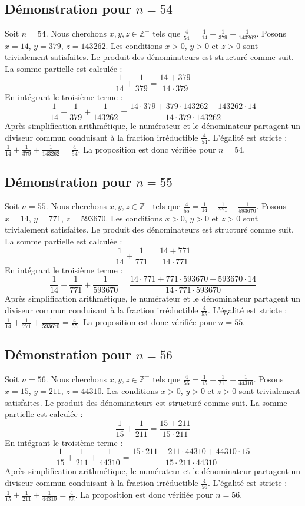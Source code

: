\documentclass[11pt,a4paper]{article}
\begin{document}
\subsection{Démonstration pour $n = 54$}
Soit $n = 54$. Nous cherchons $x, y, z \in \mathbb{Z}^{+}$ tels que $\frac{4}{54} = \frac{1}{14} + \frac{1}{379} + \frac{1}{143262}$.
Posons $x = 14$, $y = 379$, $z = 143262$.
Les conditions $x > 0$, $y > 0$ et $z > 0$ sont trivialement satisfaites.
Le produit des dénominateurs est structuré comme suit. La somme partielle est calculée :
$$ \frac{1}{14} + \frac{1}{379} = \frac{14+379}{14 \cdot 379} $$
En intégrant le troisième terme :
$$ \frac{1}{14} + \frac{1}{379} + \frac{1}{143262} = \frac{14 \cdot 379 + 379 \cdot 143262 + 143262 \cdot 14}{14 \cdot 379 \cdot 143262} $$
Après simplification arithmétique, le numérateur et le dénominateur partagent un diviseur commun conduisant à la fraction irréductible $\frac{4}{54}$.
L'égalité est stricte : $\frac{1}{14} + \frac{1}{379} + \frac{1}{143262} = \frac{4}{54}$.
La proposition est donc vérifiée pour $n = 54$.
\subsection{Démonstration pour $n = 55$}
Soit $n = 55$. Nous cherchons $x, y, z \in \mathbb{Z}^{+}$ tels que $\frac{4}{55} = \frac{1}{14} + \frac{1}{771} + \frac{1}{593670}$.
Posons $x = 14$, $y = 771$, $z = 593670$.
Les conditions $x > 0$, $y > 0$ et $z > 0$ sont trivialement satisfaites.
Le produit des dénominateurs est structuré comme suit. La somme partielle est calculée :
$$ \frac{1}{14} + \frac{1}{771} = \frac{14+771}{14 \cdot 771} $$
En intégrant le troisième terme :
$$ \frac{1}{14} + \frac{1}{771} + \frac{1}{593670} = \frac{14 \cdot 771 + 771 \cdot 593670 + 593670 \cdot 14}{14 \cdot 771 \cdot 593670} $$
Après simplification arithmétique, le numérateur et le dénominateur partagent un diviseur commun conduisant à la fraction irréductible $\frac{4}{55}$.
L'égalité est stricte : $\frac{1}{14} + \frac{1}{771} + \frac{1}{593670} = \frac{4}{55}$.
La proposition est donc vérifiée pour $n = 55$.
\subsection{Démonstration pour $n = 56$}
Soit $n = 56$. Nous cherchons $x, y, z \in \mathbb{Z}^{+}$ tels que $\frac{4}{56} = \frac{1}{15} + \frac{1}{211} + \frac{1}{44310}$.
Posons $x = 15$, $y = 211$, $z = 44310$.
Les conditions $x > 0$, $y > 0$ et $z > 0$ sont trivialement satisfaites.
Le produit des dénominateurs est structuré comme suit. La somme partielle est calculée :
$$ \frac{1}{15} + \frac{1}{211} = \frac{15+211}{15 \cdot 211} $$
En intégrant le troisième terme :
$$ \frac{1}{15} + \frac{1}{211} + \frac{1}{44310} = \frac{15 \cdot 211 + 211 \cdot 44310 + 44310 \cdot 15}{15 \cdot 211 \cdot 44310} $$
Après simplification arithmétique, le numérateur et le dénominateur partagent un diviseur commun conduisant à la fraction irréductible $\frac{4}{56}$.
L'égalité est stricte : $\frac{1}{15} + \frac{1}{211} + \frac{1}{44310} = \frac{4}{56}$.
La proposition est donc vérifiée pour $n = 56$.
\end{document}
